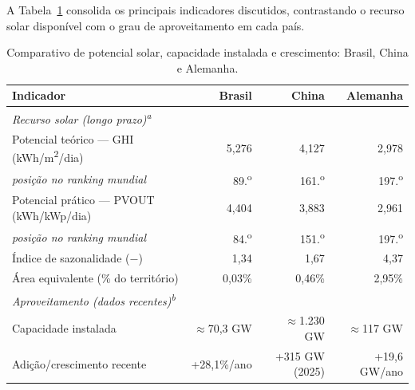 A Tabela~\ref{tab:comparacao_paises} consolida os principais indicadores
discutidos, contrastando o recurso solar disponível com o grau de
aproveitamento em cada país.

\begin{table}[htbp]
\centering
\caption{Comparativo de potencial solar, capacidade instalada e crescimento:
Brasil, China e Alemanha.}
\label{tab:comparacao_paises}
\begin{tabular}{lrrr}
\hline
\textbf{Indicador} & \textbf{Brasil} & \textbf{China} & \textbf{Alemanha} \\
\hline
\multicolumn{4}{l}{\textit{Recurso solar (longo prazo)\textsuperscript{a}}} \\
\hline
Potencial teórico --- GHI (kWh/m\textsuperscript{2}/dia) & 5,276 & 4,127 & 2,978 \\
\quad \textit{posição no ranking mundial}                & 89.\textsuperscript{o} & 161.\textsuperscript{o} & 197.\textsuperscript{o} \\
Potencial prático --- PVOUT (kWh/kWp/dia)                & 4,404 & 3,883 & 2,961 \\
\quad \textit{posição no ranking mundial}                & 84.\textsuperscript{o} & 151.\textsuperscript{o} & 197.\textsuperscript{o} \\
Índice de sazonalidade ($-$)                             & 1,34 & 1,67 & 4,37 \\
Área equivalente (\% do território)                      & 0,03\% & 0,46\% & 2,95\% \\
\hline
\multicolumn{4}{l}{\textit{Aproveitamento (dados recentes)\textsuperscript{b}}} \\
\hline
Capacidade instalada                                     & $\approx$70,3 GW & $\approx$1.230 GW & $\approx$117 GW \\
Adição/crescimento recente                               & +28,1\%/ano & +315 GW (2025) & +19,6 GW/ano \\
\hline
\end{tabular}
\end{table}

